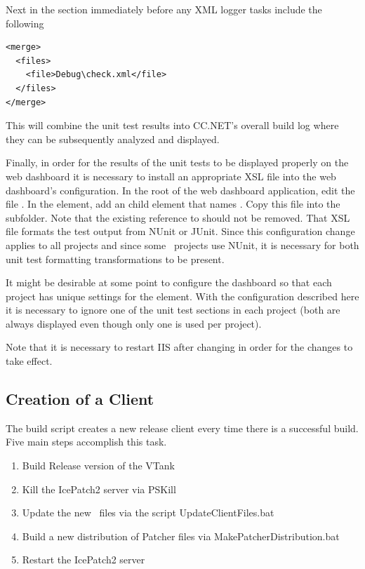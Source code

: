Next in the  section immediately before any XML logger tasks include the following
\begin{verbatim}
<merge>
  <files>
    <file>Debug\check.xml</file>
  </files>
</merge>
\end{verbatim}

This will combine the unit test results into CC.NET's overall build log where they can be subsequently analyzed and displayed.

Finally, in order for the results of the unit tests to be displayed properly on the web dashboard it is necessary to install an appropriate XSL file into the web dashboard's configuration. In the root of the web dashboard application, edit the file . In the  element, add an  child element that names . Copy this file into the  subfolder. Note that the existing reference to  should not be removed. That XSL file formats the test output from NUnit or JUnit. Since this configuration change applies to all projects and since some \VTank\ projects use NUnit, it is necessary for both unit test formatting transformations to be present.

It might be desirable at some point to configure the dashboard so that each project has unique settings for the  element. With the configuration described here it is necessary to ignore one of the unit test sections in each project (both are always displayed even though only one is used per project).

Note that it is necessary to restart IIS after changing  in order for the changes to take effect.

\subsection{Creation of a Client}

The \VTank build script creates a new release client every time there is a successful build. Five main steps accomplish this task. 
\begin{enumerate}

\item Build Release version of the VTank
\item Kill the IcePatch2 server via PSKill
\item Update the new \Client\ files via the script UpdateClientFiles.bat
\item Build a new distribution of Patcher files via MakePatcherDistribution.bat
\item Restart the IcePatch2 server

\end{enumerate}

